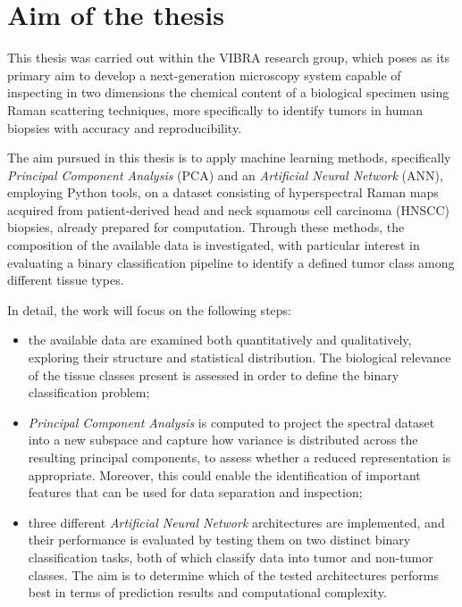 
\chapter{Aim of the thesis}
\label{sec:aim_thesis}

This thesis was carried out within the VIBRA research group, which poses as its primary aim to develop a next-generation microscopy system capable of inspecting in two dimensions the chemical content of a biological specimen using Raman scattering techniques, more specifically to identify tumors in human biopsies with accuracy and reproducibility.

The aim pursued in this thesis is to apply machine learning methods, specifically \textit{Principal Component Analysis} (PCA) and an \textit{Artificial Neural Network} (ANN), employing Python tools, on a dataset consisting of hyperspectral Raman maps acquired from
patient-derived head and neck squamous cell carcinoma (HNSCC) biopsies, already prepared for computation. Through these methods, the composition of the available data is investigated, with particular interest in evaluating a binary classification pipeline to identify a defined tumor class among different tissue types.

In detail, the work will focus on the following steps:
\begin{itemize}
    \item the available data are examined both quantitatively and qualitatively, exploring their structure and statistical distribution. The biological relevance of the tissue classes present is assessed in order to define the binary classification problem;

    \item  \textit{Principal Component Analysis} is computed to project the spectral dataset into a new subspace and capture how variance is distributed across the resulting principal components, to assess whether a reduced representation is appropriate. Moreover, this could enable the identification of important features that can be used for data separation and inspection;

    \item three different \textit{Artificial Neural Network} architectures are implemented, and their performance is evaluated by testing them on two distinct binary classification tasks, both of which classify data into tumor and non-tumor classes. The aim is to determine which of the tested architectures performs best in terms of prediction results and computational complexity.
\end{itemize}

